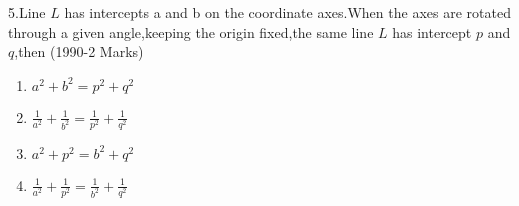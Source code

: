 \documentclass[journal,12pt,twocolumn]{IEEEtran}
\theoremstyle{remark}
\begin{document}
5.Line $L$ has intercepts a and b on the coordinate axes.When the axes are rotated through a given angle,keeping the origin fixed,the same line $L$ has intercept $p$ and $q$,then 
\hfill(1990-2 Marks)
\begin{enumerate}
    \item $a^2+b^2=p^2+q^2$
    \item $\frac{1}{a^2}+\frac{1}{b^2}=\frac{1}{p^2}+\frac{1}{q^2}$
    \item $a^2+p^2=b^2+q^2$
    \item $\frac{1}{a^2}+\frac{1}{p^2}=\frac{1}{b^2}+\frac{1}{q^2}$
\end{enumerate}
\end{document}
